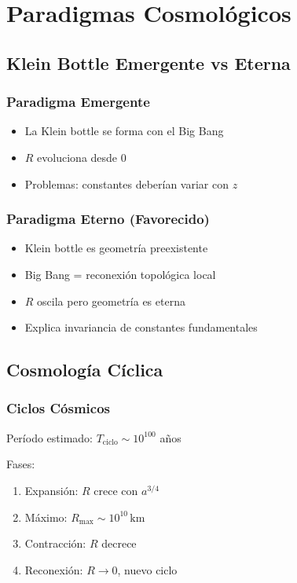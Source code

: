 \documentclass[12pt,a4paper]{article}
\begin{document}
\section{Paradigmas Cosmológicos}
\label{sec:paradigmas}

\subsection{Klein Bottle Emergente vs Eterna}

\subsubsection{Paradigma Emergente}

\begin{itemize}
    \item La Klein bottle se forma con el Big Bang
    \item $R$ evoluciona desde 0
    \item Problemas: constantes deberían variar con $z$
\end{itemize}

\subsubsection{Paradigma Eterno (Favorecido)}

\begin{itemize}
    \item Klein bottle es geometría preexistente
    \item Big Bang = reconexión topológica local
    \item $R$ oscila pero geometría es eterna
    \item Explica invariancia de constantes fundamentales
\end{itemize}

\subsection{Cosmología Cíclica}

\subsubsection{Ciclos Cósmicos}

Período estimado: $T_\mathrm{ciclo} \sim 10^{100}$ años

Fases:
\begin{enumerate}
    \item Expansión: $R$ crece con $a^{3/4}$
    \item Máximo: $R_\mathrm{max} \sim 10^{10}\,\mathrm{km}$
    \item Contracción: $R$ decrece
    \item Reconexión: $R \to 0$, nuevo ciclo
\end{enumerate}
\end{document}
